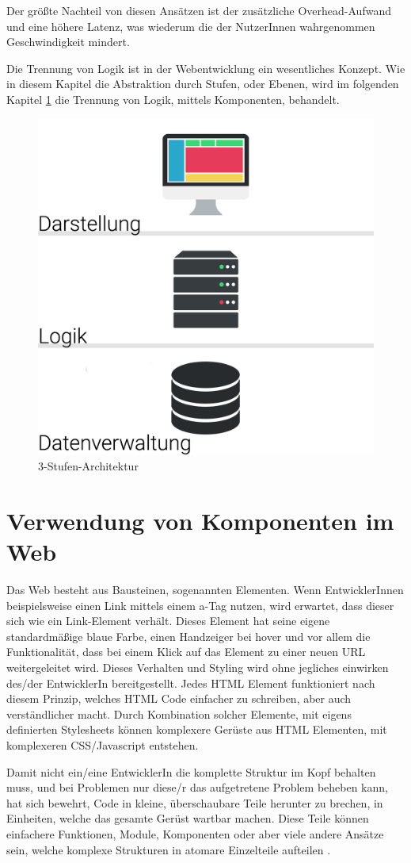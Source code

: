Der größte Nachteil von diesen Ansätzen ist der zusätzliche Overhead-Aufwand  und eine höhere Latenz, was wiederum die der NutzerInnen wahrgenommen Geschwindigkeit mindert.

Die Trennung von Logik ist in der Webentwicklung ein wesentliches Konzept. Wie in diesem Kapitel die Abstraktion durch Stufen, oder Ebenen, wird im folgenden Kapitel \ref{cha:component_usage} die Trennung von Logik, mittels Komponenten, behandelt.

\begin{figure}
	\centering
	\includegraphics[width=0.5\linewidth]{images/3-stufen-architektur}
	\caption{3-Stufen-Architektur}
	\label{fig:3-stufen-architektur}
\end{figure}

\section{Verwendung von Komponenten im Web}
\label{cha:component_usage}
Das Web besteht aus Bausteinen, sogenannten Elementen. Wenn EntwicklerInnen beispielsweise einen Link mittels einem a-Tag nutzen, wird erwartet, dass dieser sich wie ein Link-Element verhält. Dieses Element hat seine eigene standardmäßige blaue Farbe, einen Handzeiger bei hover und vor allem die Funktionalität, dass bei einem Klick auf das Element zu einer neuen URL weitergeleitet wird. Dieses Verhalten und Styling wird ohne jegliches einwirken des/der EntwicklerIn bereitgestellt. Jedes HTML Element funktioniert nach diesem Prinzip, welches HTML Code einfacher zu schreiben, aber auch verständlicher macht.
Durch Kombination solcher Elemente, mit eigens definierten Stylesheets können komplexere Gerüste aus HTML Elementen, mit komplexeren CSS/Javascript entstehen.

Damit nicht ein/eine EntwicklerIn die komplette Struktur im Kopf behalten muss, und bei Problemen nur diese/r das aufgetretene Problem beheben kann, hat sich bewehrt, Code in kleine, überschaubare Teile herunter zu brechen, in Einheiten, welche das gesamte Gerüst wartbar machen. Diese Teile können einfachere Funktionen, Module, Komponenten oder aber viele andere Ansätze sein, welche komplexe Strukturen in atomare Einzelteile aufteilen \cite{components-benefit}.

